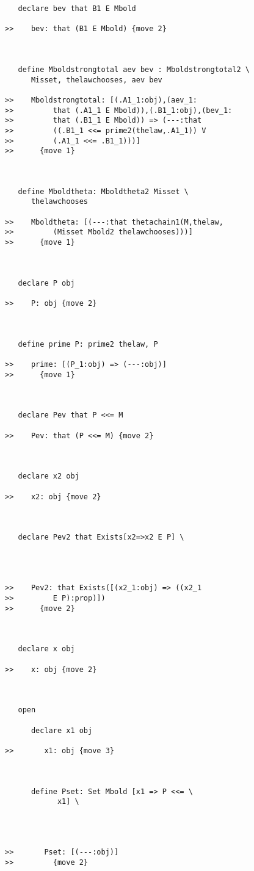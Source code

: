 \documentclass[12pt]{article}
\begin{document}
\begin{verbatim}
   declare bev that B1 E Mbold

>>    bev: that (B1 E Mbold) {move 2}



   define Mboldstrongtotal aev bev : Mboldstrongtotal2 \
      Misset, thelawchooses, aev bev

>>    Mboldstrongtotal: [(.A1_1:obj),(aev_1:
>>         that (.A1_1 E Mbold)),(.B1_1:obj),(bev_1:
>>         that (.B1_1 E Mbold)) => (---:that
>>         ((.B1_1 <<= prime2(thelaw,.A1_1)) V
>>         (.A1_1 <<= .B1_1)))]
>>      {move 1}



   define Mboldtheta: Mboldtheta2 Misset \
      thelawchooses

>>    Mboldtheta: [(---:that thetachain1(M,thelaw,
>>         (Misset Mbold2 thelawchooses)))]
>>      {move 1}



   declare P obj

>>    P: obj {move 2}



   define prime P: prime2 thelaw, P

>>    prime: [(P_1:obj) => (---:obj)]
>>      {move 1}



   declare Pev that P <<= M

>>    Pev: that (P <<= M) {move 2}



   declare x2 obj

>>    x2: obj {move 2}



   declare Pev2 that Exists[x2=>x2 E P] \
      



>>    Pev2: that Exists([(x2_1:obj) => ((x2_1
>>         E P):prop)])
>>      {move 2}



   declare x obj

>>    x: obj {move 2}



   open

      declare x1 obj

>>       x1: obj {move 3}



      define Pset: Set Mbold [x1 => P <<= \
            x1] \
         



>>       Pset: [(---:obj)]
>>         {move 2}




\end{verbatim}
\end{document}
